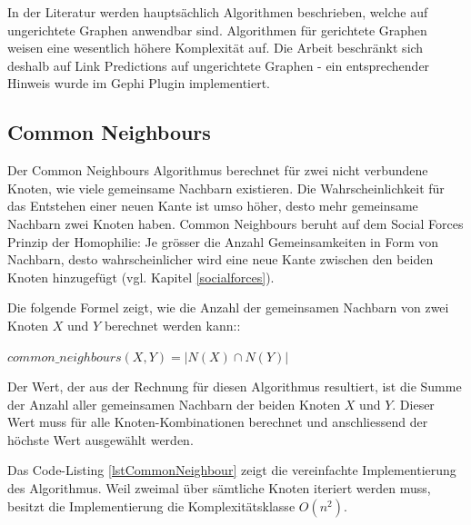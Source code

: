 In der Literatur werden hauptsächlich Algorithmen beschrieben, welche auf ungerichtete Graphen anwendbar sind. Algorithmen für gerichtete Graphen weisen eine wesentlich höhere Komplexität auf. Die Arbeit beschränkt sich deshalb auf Link Predictions auf ungerichtete Graphen -
ein entsprechender Hinweis wurde im Gephi Plugin implementiert.

\subsection{Common Neighbours}
Der Common Neighbours Algorithmus berechnet für zwei nicht verbundene Knoten, wie viele gemeinsame Nachbarn existieren. Die Wahrscheinlichkeit
für das Entstehen einer neuen Kante ist umso höher, desto mehr gemeinsame Nachbarn zwei
Knoten haben. Common Neighbours beruht auf dem Social Forces Prinzip der Homophilie: Je grösser die Anzahl Gemeinsamkeiten in Form von Nachbarn, desto wahrscheinlicher wird eine neue Kante zwischen den beiden Knoten hinzugefügt (vgl. Kapitel \ref{socialforces}).

Die folgende Formel zeigt, wie die Anzahl der gemeinsamen Nachbarn von zwei Knoten $X$ und $Y$ berechnet werden kann::

$common\_neighbours(X,Y) = | N(X) \cap N(Y) |$

Der Wert, der aus der Rechnung für diesen Algorithmus resultiert, ist die Summe der Anzahl aller gemeinsamen
Nachbarn der beiden Knoten $X$ und $Y$. Dieser Wert muss für alle Knoten-Kombinationen berechnet und anschliessend der höchste
Wert ausgewählt werden.

Das Code-Listing \ref{lstCommonNeighbour} zeigt die vereinfachte Implementierung des Algorithmus.
Weil zweimal über sämtliche Knoten iteriert werden muss, besitzt die Implementierung die Komplexitätsklasse $O(n^2)$.

